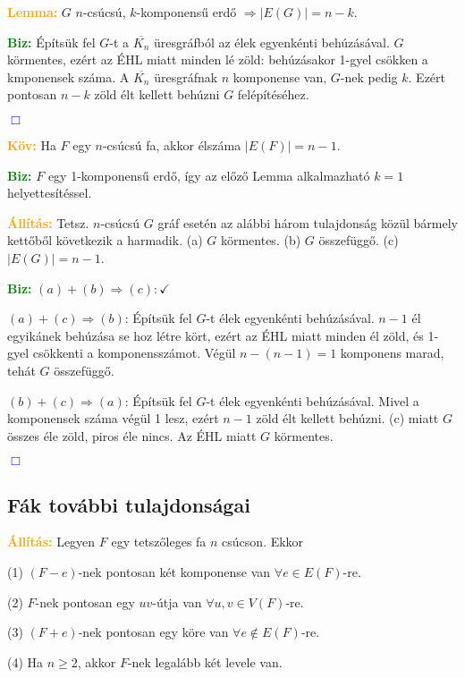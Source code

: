 \documentclass[12pt]{article}
\begin{document}
			\textcolor{orange}{\textbf{Lemma:}} $G$ $n$-csúcsú, $k$-komponensű erdő $\Rightarrow |E(G)| = n-k$.

			\textcolor{green}{\textbf{Biz:}} Építsük fel $G$-t a $\overline{K_n}$ üresgráfból az élek egyenkénti behúzásával. $G$ körmentes, ezért az ÉHL miatt minden lé zöld: behúzásakor 1-gyel csökken a kmponensek száma. A $\overline{K_n}$ üresgráfnak $n$ komponense van, $G$-nek pedig $k$. Ezért pontosan $n-k$ zöld élt kellett behúzni $G$ felépítéséhez. \raggedright \textcolor{blue}{$\Box$} 

			\textcolor{orange}{\textbf{Köv:}} Ha $F$ egy $n$-csúcsú fa, akkor élszáma $|E(F)|=n-1$.

			\textcolor{green}{\textbf{Biz:}} $F$ egy 1-komponensű erdő, így az előző Lemma alkalmazható $k=1$ helyettesítéssel.

			\textcolor{orange}{\textbf{Állítás:}} Tetsz. $n$-csúcsú $G$ gráf esetén az alábbi három tulajdonság közül bármely kettőből következik a harmadik. (a) $G$ körmentes. \qquad (b) $G$ összefüggő. \qquad (c) $|E(G)|=n-1$. 

			\textcolor{green}{\textbf{Biz:}} $(a)+(b) \Rightarrow (c): \checkmark$

			$(a)+(c)\Rightarrow (b)$: Építsük fel $G$-t élek egyenkénti behúzásával. $n-1$ él egyikánek behúzása se hoz létre kört, ezért az ÉHL miatt minden él zöld, és 1-gyel csökkenti a komponensszámot. Végül $n-(n-1)=1$ komponens marad, tehát $G$ összefüggő.

			$(b)+(c) \Rightarrow (a)$: Építsük fel $G$-t élek egyenkénti behúzásával. Mivel a komponensek száma végül 1 lesz, ezért $n-1$ zöld élt kellett behúzni. (c) miatt $G$ összes éle zöld, piros éle nincs. Az ÉHL miatt $G$ körmentes. \raggedright \textcolor{blue}{$\Box$} 

		\subsection{Fák további tulajdonságai}

			\textcolor{orange}{\textbf{Állítás:}} Legyen $F$ egy tetszőleges fa $n$ csúcson. Ekkor 

			(1) $(F-e)$-nek pontosan két komponense van $\forall e\in E(F)$-re.

			(2) $F$-nek pontosan egy $uv$-útja van $\forall u,v\in V(F)$-re.

			(3) $(F+e)$-nek pontosan egy köre van $\forall e\notin E(F)$-re.

			(4) Ha $n \geq 2$, akkor $F$-nek legalább két levele van.
\end{document}

